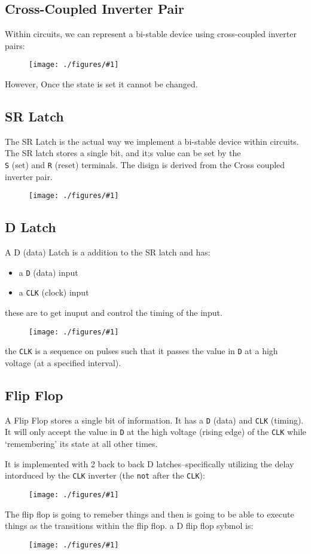 \documentclass[12pt]{book}
\newcommand{\incimg}[2]{%
       \begin{figure}[h]
               \centering
               \texttt{[image: ./figures/\#1]}
       \end{figure}
}
\begin{document}
\subsection*{Cross-Coupled Inverter Pair}
Within circuits, we can represent a bi-stable device using cross-coupled inverter pairs:
\incimg{crossCpl}{0.5}

However, Once the state is set it cannot be changed.

\subsection*{SR Latch}
The SR Latch is the actual way we implement a bi-stable device within circuits. The SR latch 
stores a single bit, and it;s value can be set by the \\\texttt{S} (set) and \texttt{R} (reset)
terminals. The disign is derived from the Cross coupled inverter pair.
\incimg{srlatch}{0.5}

\subsection*{D Latch}
A D (data) Latch is a addition to the SR latch and has:
\begin{itemize}
        \item a \texttt{D} (data) input
        \item a \texttt{CLK} (clock) input
\end{itemize}
these are to get inuput and control the timing of the input.
\incimg{dlatch}{0.5}

the \texttt{CLK} is a sequence on pulses such that it passes the value in \texttt{D} at a high 
voltage (at a specified interval). 

\subsection*{Flip Flop}
A Flip Flop stores a single bit of information. It has a \texttt{D} (data) and \texttt{CLK}
(timing).  It will only accept the value in \texttt{D} at the high voltage (rising edge)
of the \texttt{CLK} while `remembering' its state at all other times.

It is implemented with 2 back to back D latches--specifically utilizing the delay intorduced
by the \texttt{CLK} inverter (the \texttt{not} after the \texttt{CLK}):
\incimg{flipflop}{0.7}

The flip flop is going to remeber things and then is going to be able to execute things as the
transitions within the flip flop.
a D flip flop sybmol is:
\incimg{dflipsym}{0.5}
\end{document}
